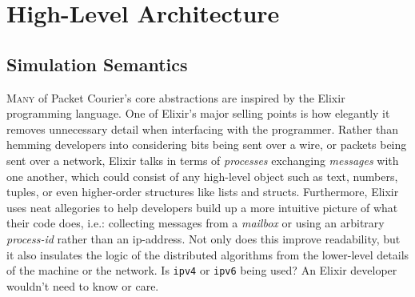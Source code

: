 \section{High-Level Architecture}\label{section:high_level_architecture}

\subsection{Simulation Semantics}\label{subsection:simulation_semantics}

\lettrine{M}{any} of Packet Courier's core abstractions are inspired by the Elixir programming language\cite{elixir}.
One of Elixir's major selling points is how elegantly it removes unnecessary detail when interfacing with the
programmer. Rather than hemming developers into considering bits being sent over a wire, or packets being sent over a
network, Elixir talks in terms of \emph{processes} exchanging \emph{messages} with one
another\cite{elixir_processes}, which could consist of any high-level object such as text, numbers, tuples, or even
higher-order structures like lists and structs. Furthermore, Elixir uses neat allegories to help developers build up
a more intuitive picture of what their code does, i.e.: collecting messages from a \emph{mailbox} or using an
arbitrary \emph{process-id} rather than an ip-address. Not only does this improve readability, but it also insulates
the logic of the distributed algorithms from the lower-level details of the machine or the network. Is \texttt{ipv4}
or \texttt{ipv6} being used? An Elixir developer wouldn't need to know or care.

